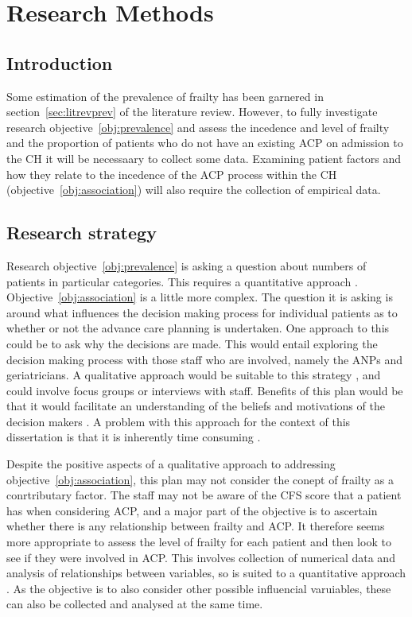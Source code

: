 \documentclass
[
	12pt,
	a4paper,
	oneside,
]{report}
\begin{document}
\chapter{Research Methods}
 
\section{Introduction}

Some estimation of the prevalence of frailty has been garnered in 
section~\ref{sec:litrevprev} of the literature review. However, to fully
investigate research objective~\ref{obj:prevalence} and assess the incedence
and level of frailty and the proportion of patients who do not have an
existing ACP on admission to the CH it will be necessaary to collect some
data. Examining patient factors and how they relate to the incedence of
the ACP process within the CH (objective~\ref{obj:association}) will
also require the collection of empirical data.

\section{Research strategy}

Research objective~\ref{obj:prevalence} is asking a question about numbers
of patients in particular categories. This requires a quantitative approach
\parencite{biggam:15}.
Objective~\ref{obj:association} is a little more complex. The question it is 
asking is around what influences the decision making process for individual
patients as to whether or not the advance care planning is undertaken. One 
approach to this could be to ask why the decisions are made. This would 
entail exploring the decision making process with those staff who are 
involved, namely the ANPs and geriatricians. A qualitative approach would
be suitable to this strategy \parencite{jolley:13}, and could involve 
focus groups or interviews with staff. Benefits of this plan would be that it 
would facilitate an understanding of the beliefs and motivations of the 
decision makers \parencite{parahoo:14}. A problem with this approach for the
context of this dissertation is that it is inherently time consuming
\parencite{jolley:13}.

Despite the positive aspects of a qualitative approach to addressing 
objective~\ref{obj:association}, this plan may not consider the conept of 
frailty
as a conrtributary factor. The staff may not be aware of the CFS score
that a patient has when considering ACP, and a major part of the objective
is to ascertain whether there is any relationship between frailty and ACP.
It therefore seems more appropriate to assess the level of frailty for each
patient and then look to see if they were involved in ACP. This involves
collection of numerical data and analysis of relationships between variables, 
so is suited to a quantitative approach \parencite{parahoo:14}. As the objective
is to also consider other possible influencial varuiables, these can also
be collected and analysed at the same time.
\end{document}
